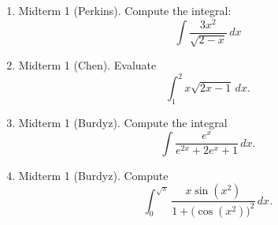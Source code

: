 \documentclass[11pt]{article}
\begin{document}

\begin{enumerate}
\item Midterm 1 (Perkins). Compute the integral:
\[\int \frac{3x^2}{\sqrt{2-x}} \, dx\]

\vspace{8cm}

\item Midterm 1 (Chen). Evaluate
\[\int_1^2 x \sqrt{2x-1} \, dx.\]

\newpage

\item Midterm 1 (Burdyz). Compute the integral
\[\int \frac{e^x}{e^{2x} + 2e^x +1} \, dx.\]

\vspace{8cm}

\item Midterm 1 (Burdyz). Compute
\[\int_0^{\sqrt{\pi}} \frac{x\sin(x^2)}{1 + \big ( \cos(x^2) \big )^2} \, dx.\]
\end{enumerate}
\end{document}
